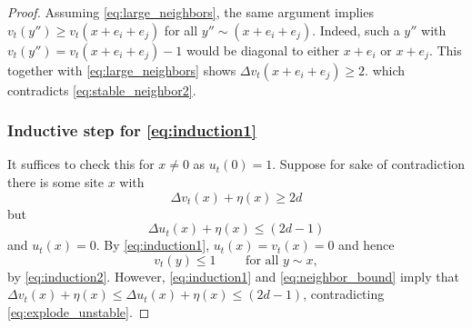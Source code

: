 \documentclass[12pt]{amsart}
\begin{document}
\begin{proof}
	
	Assuming \eqref{eq:large_neighbors}, the same argument implies $v_t(y'') \geq v_t(x+e_i+e_j)$ for all $y'' \sim (x+e_i+e_j)$.
	Indeed, such a $y''$ with $v_t(y'') = v_t(x + e_i + e_j) - 1$ would be diagonal 
	to either $x + e_i$ or $x + e_j$. 
	This together with \eqref{eq:large_neighbors} shows $\Delta v_t(x + e_i + e_j) \geq 2$. 
	which contradicts \eqref{eq:stable_neighbor2}.
	
	
	
	
	\subsubsection*{Inductive step for \eqref{eq:induction1}}
	It suffices to check this for $x \not = 0$ as $u_t(0) = 1$. 
	Suppose for sake of contradiction there is some site $x$ with 
	\begin{equation} \label{eq:explode_unstable}
	\Delta v_t(x) + \eta(x) \geq 2 d
	\end{equation}
	but
	\begin{equation} \label{eq:wave_stable}
	\Delta u_t(x) + \eta(x) \leq (2 d -1)
	\end{equation}
	and $u_t(x) = 0$. By \eqref{eq:induction1}, $u_t(x) = v_t(x) = 0$ and hence 
	\begin{equation} \label{eq:neighbor_bound}
	v_t(y) \leq 1 \qquad \mbox{ for all $y \sim x$},
	\end{equation}
	by \eqref{eq:induction2}. However, \eqref{eq:induction1} and \eqref{eq:neighbor_bound} imply that
	$\Delta v_t(x) + \eta(x) \leq \Delta u_t(x) + \eta(x) \leq (2 d -1)$, contradicting \eqref{eq:explode_unstable}. 
	
	
	
	
	
	

\end{proof}
\end{document}
